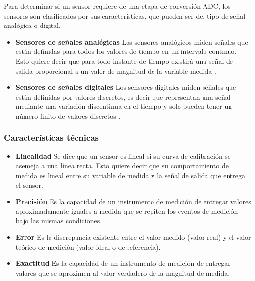 Para determinar si un sensor requiere de una etapa de conversión ADC, los sensores son clasificados por sus características, que pueden ser del tipo de señal analógica o digital.

\begin{itemize}
    \item \textbf{Sensores de señales analógicas}
    Los sensores analógicos miden señales que están definidas para todos los valores de tiempo en un intervalo continuo. Esto quiere decir que para todo instante de tiempo existirá una señal de salida proporcional a un valor de magnitud de la variable medida \cite{benitez}.
    
    \item \textbf{Sensores de señales digitales}
    Los sensores digitales miden señales que están definidas por valores discretos, es decir que representan una señal mediante una variación discontinua en el tiempo y solo pueden tener un número finito de valores discretos \cite{benitez}.
\end{itemize}


\subsubsection{Características técnicas}
\begin{itemize}
    \item \textbf{Linealidad}
    Se dice que un sensor es lineal si su curva de calibración se asemeja a una línea recta. Esto quiere decir que su comportamiento de medida es lineal entre su variable de medida y la señal de salida que entrega el sensor.
    
    \item \textbf{Precisión}
    Es la capacidad de un instrumento de medición de entregar valores aproximadamente iguales a medida que se repiten los eventos de medición bajo las mismas condiciones.
    
    \item \textbf{Error}
    Es la discrepancia existente entre el valor medido (valor real) y el valor teórico de medición (valor ideal o de referencia).
    
    \item \textbf{Exactitud}
    Es la capacidad de un instrumento de medición de entregar valores que se aproximen al valor verdadero de la magnitud de medida.
    
\end{itemize}


